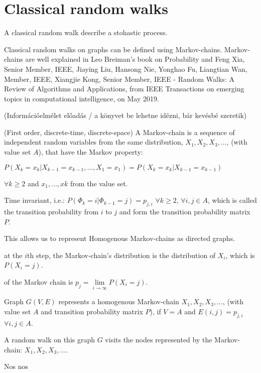 \section{Classical random walks}

A classical random walk describe a stohastic process.


Classical random walks on graphs can be defined using Markov-chains. Markov-chains
are well explained in Leo Breiman's book on Probability\cite{breiman_probability_1992} and Feng Xia, Senior Member, IEEE, Jiaying Liu, Hansong Nie, Yonghao Fu, Liangtian Wan, Member, IEEE,
Xiangjie Kong, Senior Member, IEEE - Random Walks: A Review of Algorithms and Applications, from IEEE Transactions on emerging topics in computational intelligence, on May 2019.

(Információelmélet előadás / a könyvet be lehetne idézni, bár kevésbé szeretik)

 (First order, discrete-time, discrete-space) A Markov-chain is a sequence of independent random variables from the same distribution, $X_1, X_2, X_3, \dots$, (with value set $A$), that have the Markov property:


$P(X_k = x_k | X_{k-1} = x_{k-1}, \dots, X_1 = x_1) = P(X_k = x_k | X_{k-1} = x_{k-1})$

$\forall k\geq{}2$ and $x_{1},\dots, x{k}$ from the value set.

 Time invariant, i.e.:
$P(\Phi_k = i | \Phi_{k-1} = j) = p_{j,i}$ $\forall k\geq{}2$, $\forall i,j \in{} A$, which is called the transition probability from $i$ to $j$ and form the transition probability matrix $P$.

This allows us to represent Homogenous Markov-chains as directed graphs.

 at the $i$th step, the Markov-chain's distribution is the distribution of $X_i$, which is $P(X_i = j)$.

 of the Markov chain is $p_{j} = \lim\limits_{i \to \infty} P(X_i = j)$.

Graph $G(V,E)$ represents a homogenous Markov-chain $X_1, X_2, X_3, \dots$, (with value set $A$ and transition probability matrix $P$), if $V=A$ and $E(i,j) = p_{j,i}$ $\forall{}i,j\in{}A$.

A random walk on this graph $G$ visits the nodes represented by the Markov-chain: $X_1, X_2, X_3, \dots$.

Nos nos